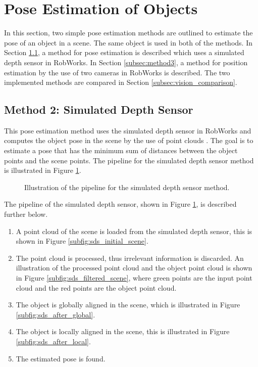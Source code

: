 \documentclass[../main.tex]{subfiles}
\begin{document}
\section{Pose Estimation of Objects} \label{sec:vision}
In this section, two simple pose estimation methods are outlined to estimate the pose of an object in a scene. The same object is used in both of the methods. In Section \ref{subsec:method2}, a method for pose estimation is described which uses a simulated depth sensor in RobWorks. In Section \ref{subsec:method3}, a method for position estimation by the use of two cameras in RobWorks is described. The two implemented methods are compared in Section \ref{subsec:vision_comparison}.

\subsection{Method 2: Simulated Depth Sensor} \label{subsec:method2}
This pose estimation method uses the simulated depth sensor in RobWorks and computes the object pose in the scene by the use of point clouds \cite{point_cloud_library}. The goal is to estimate a pose that has the minimum sum of distances between the object points and the scene points. The pipeline for the simulated depth sensor method is illustrated in Figure \ref{fig:sds_process}.
\begin{figure}[H]
    \centering
    \noindent\makebox[\textwidth][c]{}
    \caption{Illustration of the pipeline for the simulated depth sensor method.}
    \label{fig:sds_process}
\end{figure}
The pipeline of the simulated depth sensor, shown in Figure \ref{fig:sds_process}, is described further below.
\begin{enumerate}
    \item A point cloud of the scene is loaded from the simulated depth sensor, this is shown in Figure \ref{subfig:sds_initial_scene}.
    \item The point cloud is processed, thus irrelevant information is discarded. An illustration of the processed point cloud and the object point cloud is shown in Figure \ref{subfig:sds_filtered_scene}, where green points are the input point cloud and the red points are the object point cloud.
    \item The object is globally aligned in the scene, which is illustrated in Figure \ref{subfig:sds_after_global}.
    \item The object is locally aligned in the scene, this is illustrated in Figure \ref{subfig:sds_after_local}.
    \item The estimated pose is found.
\end{enumerate}
\end{document}
